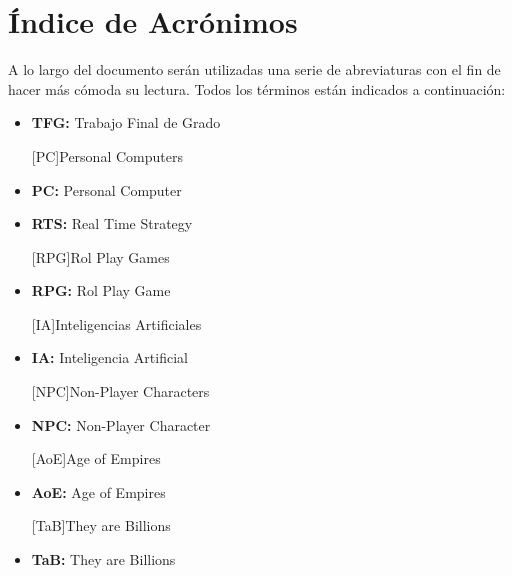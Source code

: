 \chapter*{Índice de Acrónimos}
\label{acronimos}


A lo largo del documento serán utilizadas una serie de abreviaturas con el fin de
hacer más cómoda su lectura. Todos los términos están indicados a continuación: 

\begin{itemize}

[TFG]{Trabajos Finales de Grado}
\item \textbf{TFG:} Trabajo Final de Grado

[PC]{Personal Computers}
\item \textbf{PC:} Personal Computer

\item \textbf{RTS:} Real Time Strategy

[RPG]{Rol Play Games}
\item \textbf{RPG:} Rol Play Game

[IA]{Inteligencias Artificiales}
\item \textbf{IA:} Inteligencia Artificial

[NPC]{Non-Player Characters}
\item \textbf{NPC:} Non-Player Character

[AoE]{Age of Empires}
\item \textbf{AoE:} Age of Empires

[TaB]{They are Billions}
\item \textbf{TaB:} They are Billions


\end{itemize}